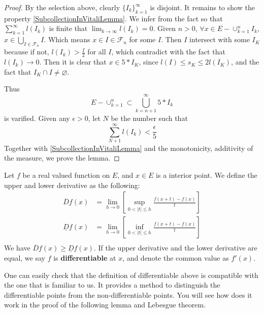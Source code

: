 \documentclass[lang=en, 12pt]{elegantbook}
\begin{document}
\begin{proof}
            By the selection above, clearly $\{I_k\}_{k=1}^{\infty}$ is disjoint. It remains to show the property \eqref{SubcollectionInVitaliLemma}.
        We infer from the fact so that $\sum_{k=1}^{\infty} l(I_k)$ is finite that $\lim_{k \to \infty}l(I_k) = 0$.
        Given $n>0$, $\forall x \in E- \cup_{k=1}^{n} I_k$, $x \in \bigcup_{I \in \mathcal{F}_n} I$. Which means $x \in I \in \mathcal{F}_n$
        for some $I$. Then $I$ intersect with some $I_K$ because if not, $l(I_k) > \frac{I}{2}$ for all $I$, which contradict with the 
        fact that $l(I_k) \to 0$. Then it is clear that $x \in 5*I_K$,
        since $l(I) \leq  s_K \leq 2 l(I_K)$, and the fact that $I_K \cap I \neq \varnothing$. \par
            Thus 
            $$E- \cup_{k=1}^{n} \subset \bigcup_{k=n+1}^{\infty} 5*I_k$$
            is varified. Given any $\epsilon>0$, let $N$ be the number such that 
            $$\sum_{N+1}^{\infty} l(I_k) <\frac{\epsilon}{5}$$
            Together with \eqref{SubcollectionInVitaliLemma} and the monotonicity, additivity of the measure, we prove the lemma.
        \end{proof}
        \begin{definition}
            Let $f$ be a real valued function on $E$, and $x \in E$ is a interior point. We define the upper and lower derivative as 
        the following:
        \begin{equation*}
            \begin{aligned}
                \overline{D}f(x) &= \lim_{h \to 0} \left[ \sup_{0<|t|\leq h} \frac{f(x+t)-f(x)}{t}\right]\\
                \underline{D}f(x) &= \lim_{h \to 0} \left[ \inf_{0<|t|\leq h} \frac{f(x+t)-f(x)}{t}\right]\\
            \end{aligned}
        \end{equation*}
        We have $\overline{D}f(x) \geq \underline{D}f(x)$. If the upper derivative and the lower derivative are equal, we say $f$ is 
        \textbf{differentiable} at $x$, and denote the common value as $f'(x)$. 
        \end{definition}
        One can easily check that the definition of differentiable above is compatible with the one that is familiar to us. It provides a  
    method to distinguish the differentiable points from the non-differentiable points. You will see how does it work in the proof of the
    following lemma and Lebesgue theorem.\par 
\end{document}
